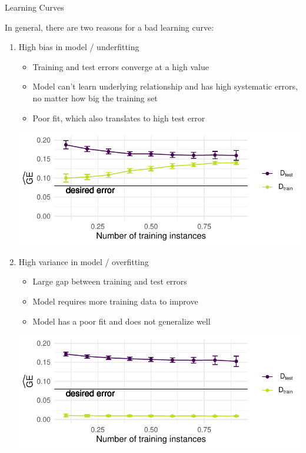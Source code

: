 \begin{frame}[c,allowframebreaks]{Learning Curves}
    \framebreak

    In general, there are two reasons for a bad learning curve:

    \begin{enumerate}
    \item High bias in model / underfitting
    \begin{itemize}
    \item Training and test errors converge at a high value
    \item Model can't learn underlying relationship and has high systematic errors, no matter how big the training set
    \item Poor fit, which also translates to high test error
    \end{itemize}

    \begin{center}
    \includegraphics[width=.7\textwidth]{learning-curve-underfitting}
    \end{center}

    \framebreak

    \item High variance in model / overfitting
    \begin{itemize}
    \item Large gap between training and test errors
    \item Model requires more training data to improve
    \item Model has a poor fit and does not generalize well
    \end{itemize}

    \begin{center}
    \includegraphics[width=.7\textwidth]{learning-curve-overfitting}
    \end{center}

    \end{enumerate}
    \end{frame}


